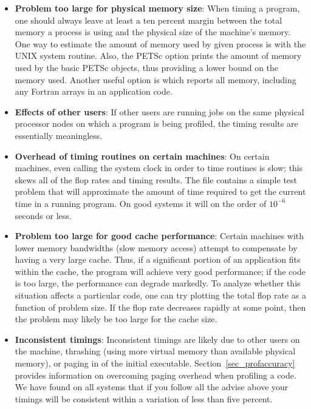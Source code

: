 {{\begin{itemize}
\item {\bf Problem too large for physical memory size}: When timing a program, one
      should always leave at least a ten percent margin between the total
      memory a process is using and the physical size of
      the machine's memory. One way to estimate the amount of
      memory used by given process is with the UNIX  system routine.
      Also, the PETSc option  prints the amount of
      memory used by the basic PETSc objects, thus providing a lower
      bound on the memory used.  Another useful option is 
      which reports all memory, including any Fortran arrays in an
      application code.
\item {\bf Effects of other users}:  If other users are running
      jobs on the same physical processor nodes on which a program is being profiled,
      the timing results are essentially meaningless.
\item {\bf Overhead of timing routines on certain machines}: On certain machines,
      even calling the system clock in order to time routines is
      slow; this skews all of the flop rates and timing results. The file
      \href{http://www.mcs.anl.gov/petsc/petsc-current/src/benchmarks/PetscTime.c.html}{} contains a 
      simple test problem that will approximate the amount of time
      required to get the current time in a running program. On good
      systems it will on the order of $10^{-6}$ seconds or less.
\item {\bf Problem too large for good cache performance}: Certain machines
      with lower memory bandwidths (slow memory access) attempt to
      compensate by having a very large cache.  Thus, if a significant
      portion of an application fits within the cache, the program will achieve very
      good performance; if the code is too large, the performance can degrade markedly.
      To analyze whether this situation affects a particular code, one can
      try plotting the total flop rate as a function of problem
      size.  If the flop rate decreases rapidly at some point, then the
      problem may likely be too large for the cache size.
\item {\bf Inconsistent timings}:  Inconsistent timings are likely due to other
      users on the machine, thrashing (using more virtual memory than available
      physical memory), or paging in of the initial executable.
      Section~\ref{sec_profaccuracy} provides information on overcoming paging
      overhead when profiling a code. We have found on all systems that if you
      follow all the advise above your timings will be consistent within a variation
      of less than five percent.
\end{itemize}

}}
